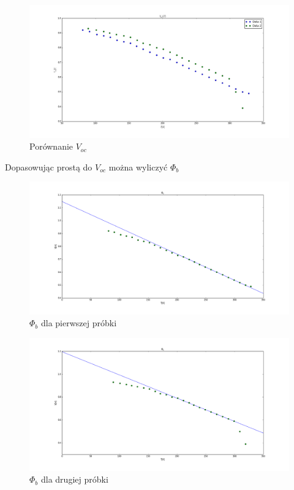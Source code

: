 \documentclass[a4paper,12pt]{article}
\begin{document}
\begin{figure} [H]
  \begin{center}
    \includegraphics[width = 15cm]{probki_porownanie_V_oc.png}
    \caption{Porównanie $V_{oc}$}
  \end{center}
\end{figure}





Dopasowując prostą do $V_{oc}$ można wyliczyć  $\Phi_b$
\begin{figure} [H]
  \begin{center}
    \includegraphics[width = 15cm]{probka1_phi_b.png}
    \caption{$\Phi_b$ dla pierwszej próbki}
  \end{center}
\end{figure}

\begin{figure} [H]
  \begin{center}
    \includegraphics[width = 15cm]{probka2_phi_b.png}
    \caption{$\Phi_b$ dla drugiej próbki}
  \end{center}
\end{figure}
\end{document}
